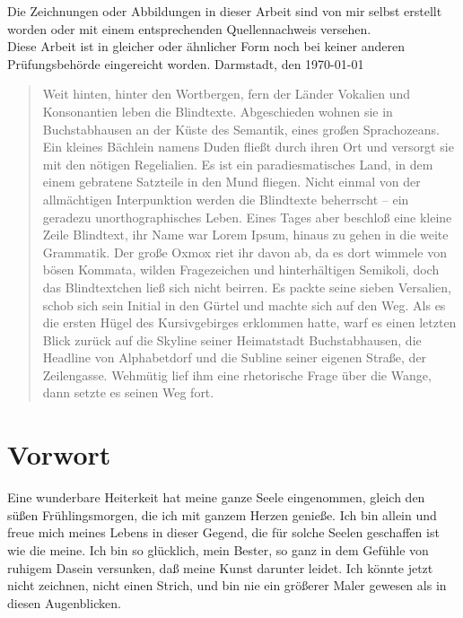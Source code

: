 \documentclass[a4paper,12pt]{article}
\begin{document}
\noindent Die Zeichnungen oder Abbildungen in dieser Arbeit sind von mir selbst erstellt worden oder mit
einem entsprechenden Quellennachweis versehen. \\

\noindent Diese Arbeit ist in gleicher oder ähnlicher Form noch bei keiner anderen Prüfungsbehörde
eingereicht worden.
\newline\newline
Darmstadt, den \today
\newpage
\begin{abstract}
Weit hinten, hinter den Wortbergen, fern der Länder Vokalien und Konsonantien leben die Blindtexte. Abgeschieden wohnen sie in Buchstabhausen an der Küste des Semantik, eines großen Sprachozeans. Ein kleines Bächlein namens Duden fließt durch ihren Ort und versorgt sie mit den nötigen Regelialien. Es ist ein paradiesmatisches Land, in dem einem gebratene Satzteile in den Mund fliegen. Nicht einmal von der allmächtigen Interpunktion werden die Blindtexte beherrscht – ein geradezu unorthographisches Leben. Eines Tages aber beschloß eine kleine Zeile Blindtext, ihr Name war Lorem Ipsum, hinaus zu gehen in die weite Grammatik. Der große Oxmox riet ihr davon ab, da es dort wimmele von bösen Kommata, wilden Fragezeichen und hinterhältigen Semikoli, doch das Blindtextchen ließ sich nicht beirren. Es packte seine sieben Versalien, schob sich sein Initial in den Gürtel und machte sich auf den Weg. Als es die ersten Hügel des Kursivgebirges erklommen hatte, warf es einen letzten Blick zurück auf die Skyline seiner Heimatstadt Buchstabhausen, die Headline von Alphabetdorf und die Subline seiner eigenen Straße, der Zeilengasse. Wehmütig lief ihm eine rhetorische Frage über die Wange, dann setzte es seinen Weg fort.
\end{abstract}
\newpage
\section*{Vorwort}
Eine wunderbare Heiterkeit hat meine ganze Seele eingenommen, gleich den süßen Frühlingsmorgen, die ich mit ganzem Herzen genieße. Ich bin allein und freue mich meines Lebens in dieser Gegend, die für solche Seelen geschaffen ist wie die meine. Ich bin so glücklich, mein Bester, so ganz in dem Gefühle von ruhigem Dasein versunken, daß meine Kunst darunter leidet. Ich könnte jetzt nicht zeichnen, nicht einen Strich, und bin nie ein größerer Maler gewesen als in diesen Augenblicken.
\end{document}

